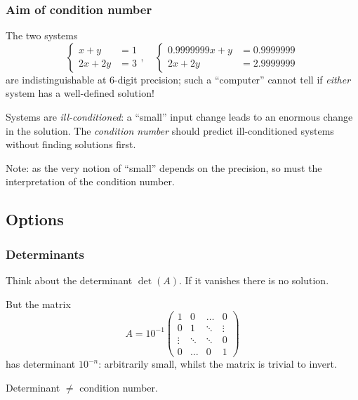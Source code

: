 \documentclass{beamer}
\begin{document}
\begin{frame}
  \frametitle{Aim of condition number}

  The two systems
  \begin{equation*}
    \left\{
      \begin{aligned}
          x +   y & = 1 \\
        2 x + 2 y & = 3
      \end{aligned}
    \right., \quad
    \left\{
      \begin{aligned}
        0.9999999  x +   y & = 0.9999999 \\
        2          x + 2 y & = 2.9999999
      \end{aligned}
    \right.
  \end{equation*}
  are indistinguishable at 6-digit precision; such a ``computer''
  cannot tell if \emph{either} system has a well-defined solution!
  \pause

  \vspace{1ex}

  Systems are \emph{ill-conditioned}: a ``small'' input change leads
  to an enormous change in the solution. \pause The \emph{condition
    number} should predict ill-conditioned systems without finding
  solutions first. \pause

  \vspace{1ex}

  Note: as the very notion of ``small'' depends on the precision, so
  must the interpretation of the condition number.

\end{frame}

\subsection{Options}

\begin{frame}
  \frametitle{Determinants}

  Think about the determinant $\det(A)$. If it vanishes there is no
  solution. \pause

  \vspace{1ex}

  But the matrix
  \begin{equation*}
    A = 10^{-1}
    \begin{pmatrix}
      1 & 0 & \dots & 0 \\
      0 & 1 & \ddots & \vdots \\
      \vdots & \ddots & \ddots & 0 \\
      0 & \dots & 0 & 1
    \end{pmatrix}
  \end{equation*}
  has determinant $10^{-n}$: arbitrarily small, whilst the matrix is
  trivial to invert.

  \vspace{1ex}

  Determinant $\ne$ condition number.

\end{frame}
\end{document}
